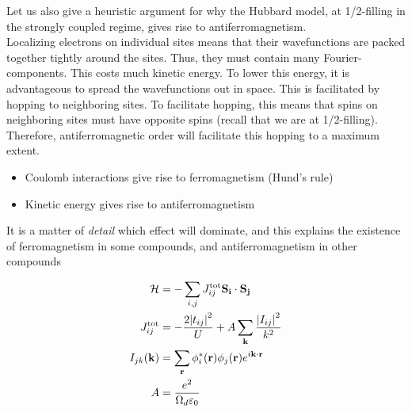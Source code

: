 Let us also give a heuristic argument for why the Hubbard model, at 1/2-filling in the strongly coupled regime, gives rise to antiferromagnetism. \\

Localizing electrons on individual sites means that their wavefunctions are packed together tightly around the sites. Thus, they must contain many Fourier-components. This costs much kinetic energy. To lower this energy, it is advantageous to spread the wavefunctions out in space. This is facilitated by hopping to neighboring sites. To facilitate hopping, this means that spins on neighboring sites must have opposite spins (recall that we are at 1/2-filling). Therefore, antiferromagnetic order will facilitate this hopping to a maximum extent.

\begin{itemize}
    \item Coulomb interactions give rise to ferromagnetism (Hund's rule)
    
    \item Kinetic energy gives rise to antiferromagnetism
\end{itemize}

\begin{tcolorbox}
It is a matter of \emph{detail} which effect will dominate, and this explains the existence of ferromagnetism in some compounds, and antiferromagnetism in other compounds
\end{tcolorbox}

\begin{align}
    \mathcal{H} &= -\sum_{i, j} J_{ij}^{\text{tot}} \vb{S_i} \cdot \vb{S_j} \\
    J_{ij}^{\text{tot}} &= - \frac{2\abs{t_{ij}}^2}{U} + A\sum_{\vb{k}}\frac{\abs{I_{ij}}^2}{k^2} \\
    I_{jk}(\vb{k}) &= \sum_{\vb{r}}\phi_i^*(\vb{r})\phi_j(\vb{r}) e^{i\vb{k} \cdot \vb{r}} \\
A &= \frac{e^2}{\Omega_d \varepsilon_0}
\end{align}

